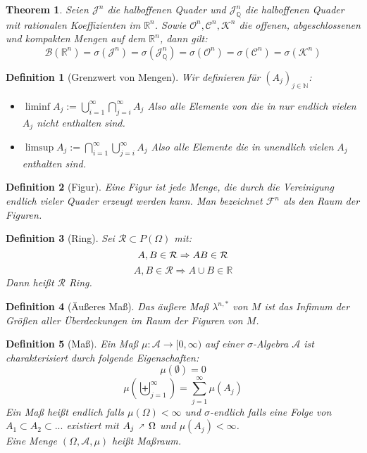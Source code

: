 \documentclass[10pt,a4paper]{article}
\makeatletter
\newtheorem{theorem}{Theorem}
\newtheorem{definition}{Definition}
\newcommand{\fixed@sra}{$\vrule height 2\fontdimen22\textfont2 width 0pt\shortrightarrow$}
\newcommand{\shortarrow}[1]{%
	\mathrel{\text{\rotatebox[origin=c]{\numexpr#1*45}{\fixed@sra}}}
}
\makeatother
\begin{document}
\begin{theorem}
	Seien $\mathcal{J}^n$ die halboffenen Quader und $\mathcal{J}^n_\mathbb{Q}$ die halboffenen Quader mit rationalen Koeffizienten im $\mathbb{R}^n$. Sowie $\mathcal{O}^n, \mathcal{C}^n, \mathcal{K}^n$ die offenen, abgeschlossenen und kompakten Mengen auf dem $\mathbb{R}^n$, dann gilt:
	$$\mathcal{B}(\mathbb{R}^n) = \sigma(\mathcal{J}^n) = \sigma(\mathcal{J}^n_\mathbb{Q}) = \sigma(\mathcal{O}^n) = \sigma(\mathcal{C}^n) = \sigma(\mathcal{K}^n)$$
\end{theorem}
\begin{definition}[Grenzwert von Mengen]
	Wir definieren für $(A_j)_{j\in \mathbb{N}}$:
	\begin{itemize}
		\item $\liminf A_j := \bigcup_{i=1}^\infty\bigcap_{j=i}^\infty A_j$ Also alle Elemente von die in nur endlich vielen $A_j$ nicht enthalten sind.
		\item $\limsup A_j := \bigcap_{i=1}^\infty \bigcup_{j=i}^\infty A_j$ Also alle Elemente die in unendlich vielen $A_j$ enthalten sind.
	\end{itemize}
\end{definition}
\begin{definition}[Figur]
	Eine Figur ist jede Menge, die durch die Vereinigung endlich vieler Quader erzeugt werden kann. Man bezeichnet $\mathcal{F}^n$ als den Raum der Figuren.
\end{definition}
\begin{definition}[Ring]
	Sei $\mathcal{R} \subset P(\Omega)$ mit:
	$$A, B \in \mathcal{R} \Rightarrow A\\B \in \mathcal{R}$$
	$$A, B \in \mathcal{R} \Rightarrow A\cup B \in \mathbb{R}$$
	Dann heißt $\mathcal{R}$ Ring.
\end{definition}
\begin{definition}[Äußeres Maß]
	Das äußere Maß $\lambda^{n, *}$ von $M$ ist das Infimum der Größen aller Überdeckungen im Raum der Figuren von $M$.
\end{definition}
\begin{definition}[Maß]
	Ein Maß $\mu: \mathcal{A} \to [0, \infty)$ auf einer $\sigma$-Algebra $\mathcal{A}$ ist charakterisiert durch folgende Eigenschaften:
	$$\mu(\emptyset) = 0$$
	$$\mu(\biguplus_{j=1}^\infty) = \sum_{j=1}^{\infty}\mu(A_j)$$
	Ein Maß heißt endlich falls $\mu(\Omega) < \infty$ und $\sigma$-endlich falls eine Folge von $A_1 \subset A_2 \subset ...$ existiert mit $A_j \shortarrow{1} \Omega$ und $\mu(A_j) < \infty$.\\
	Eine Menge $(\Omega, \mathcal{A}, \mu)$ heißt Maßraum.
	
\end{definition}
\end{document}
